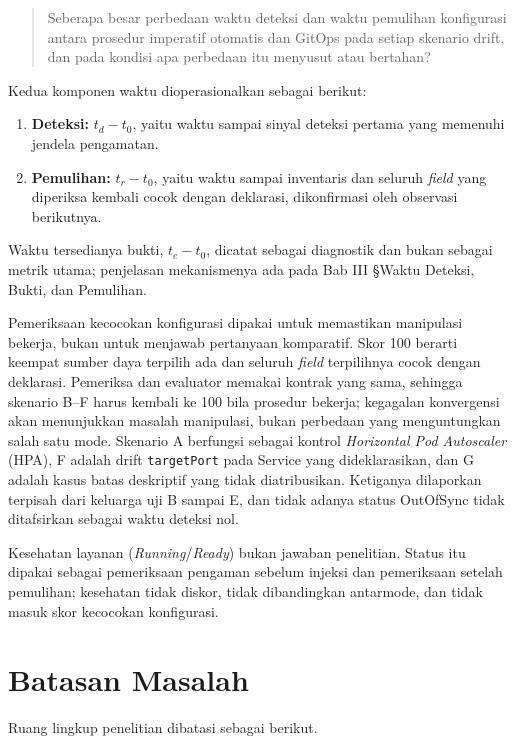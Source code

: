 \begin{quote}
Seberapa besar perbedaan waktu deteksi dan waktu pemulihan konfigurasi antara prosedur imperatif otomatis dan GitOps pada setiap skenario drift, dan pada kondisi apa perbedaan itu menyusut atau bertahan?
\end{quote}

Kedua komponen waktu dioperasionalkan sebagai berikut:
\begin{enumerate}
  \item \textbf{Deteksi:} $t_d - t_0$, yaitu waktu sampai sinyal deteksi pertama yang memenuhi jendela pengamatan.
  \item \textbf{Pemulihan:} $t_r - t_0$, yaitu waktu sampai inventaris dan seluruh \textit{field} yang diperiksa kembali cocok dengan deklarasi, dikonfirmasi oleh observasi berikutnya.
\end{enumerate}

Waktu tersedianya bukti, $t_e - t_0$, dicatat sebagai diagnostik dan bukan sebagai metrik utama; penjelasan mekanismenya ada pada Bab III §Waktu Deteksi, Bukti, dan Pemulihan.

Pemeriksaan kecocokan konfigurasi dipakai untuk memastikan manipulasi bekerja, bukan untuk menjawab pertanyaan komparatif. Skor 100 berarti keempat sumber daya terpilih ada dan seluruh \textit{field} terpilihnya cocok dengan deklarasi. Pemeriksa dan evaluator memakai kontrak yang sama, sehingga skenario B--F harus kembali ke 100 bila prosedur bekerja; kegagalan konvergensi akan menunjukkan masalah manipulasi, bukan perbedaan yang menguntungkan salah satu mode. Skenario A berfungsi sebagai kontrol \textit{Horizontal Pod Autoscaler} (HPA), F adalah drift \texttt{targetPort} pada Service yang dideklarasikan, dan G adalah kasus batas deskriptif yang tidak diatribusikan. Ketiganya dilaporkan terpisah dari keluarga uji B sampai E, dan tidak adanya status OutOfSync tidak ditafsirkan sebagai waktu deteksi nol.

Kesehatan layanan (\textit{Running}/\textit{Ready}) bukan jawaban penelitian. Status itu dipakai sebagai pemeriksaan pengaman sebelum injeksi dan pemeriksaan setelah pemulihan; kesehatan tidak diskor, tidak dibandingkan antarmode, dan tidak masuk skor kecocokan konfigurasi.

\section{Batasan Masalah}

Ruang lingkup penelitian dibatasi sebagai berikut.

